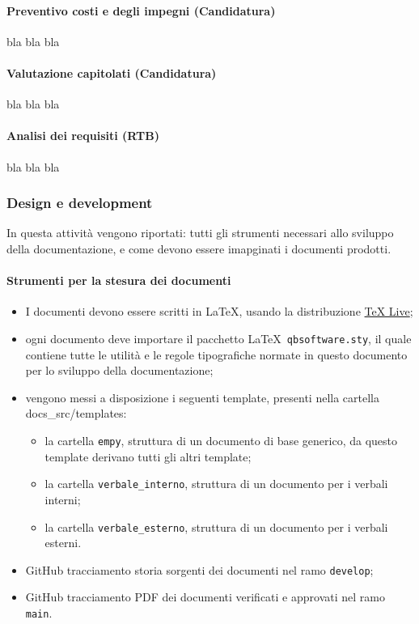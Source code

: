         \paragraph{Preventivo costi e degli impegni (Candidatura)}
            bla bla bla

        \paragraph{Valutazione capitolati (Candidatura)}
            bla bla bla

        \paragraph{Analisi dei requisiti (RTB)}
            bla bla bla


    \subsubsection{Design e development}
        In questa attività vengono riportati: tutti gli strumenti necessari allo sviluppo della documentazione, e come devono essere imapginati i documenti prodotti. 
    
        \paragraph{Strumenti per la stesura dei documenti}
            \begin{itemize}
                \item I documenti devono essere scritti in \LaTeX, usando la distribuzione \href{https://tug.org/texlive/}{TeX Live};
                \item ogni documento deve importare il pacchetto \LaTeX\ \texttt{qbsoftware.sty}, il quale contiene tutte le utilità e le regole tipografiche normate in questo documento per lo sviluppo della documentazione;
                \item vengono messi a disposizione i seguenti template, presenti nella cartella docs\_src/templates:
                \begin{itemize}
                    \item la cartella \verb|empy|, struttura di un documento di base generico, da questo template derivano tutti gli altri template;
                    \item la cartella \verb|verbale_interno|, struttura di un documento per i verbali interni;
                    \item la cartella \verb|verbale_esterno|, struttura di un documento per i verbali esterni.
                \end{itemize}
                \item GitHub tracciamento storia sorgenti dei documenti nel ramo \verb|develop|;
                \item GitHub tracciamento PDF dei documenti verificati e approvati nel ramo \verb|main|.
            \end{itemize}
    
